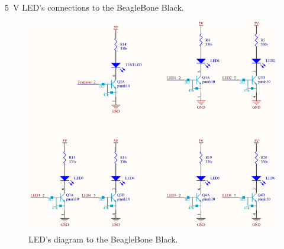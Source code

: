 \SI{5}{V} LED's connections to the BeagleBone Black.
\begin{figure}[H]
	\centering
	\includegraphics[scale=0.92]{figures/Led.pdf}
	\caption{LED's diagram to the BeagleBone Black.}
	\label{labLed}
\end{figure}\vspace{-5mm}


